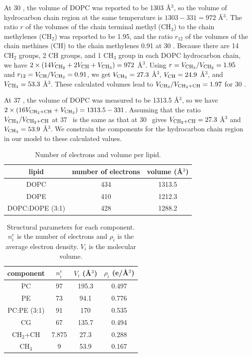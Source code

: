At 30 \textcelsius, the volume of DOPC was reported to be 1303 \AA$^3$, 
so the volume of hydrocarbon chain region at the same temperature is 
$1303 - 331 = 972$ \AA$^3$. The ratio $r$ of the volumes
of the chain terminal methyl (CH$_3$) to the chain methylenes (CH$_2$) was 
reported to be 1.95, and the ratio $r_{12}$ of the volumes of the chain
methines (CH) to the chain methylenes 0.91 at 30 \textcelsius. 
Because there are 14 CH$_2$ groups,
2 CH groups, and 1 CH$_3$ group in each DOPC hydrocarbon chain, we have
$2\times(14V_{\textrm{CH}_2}+2V_\textrm{CH}+V_{\textrm{CH}_3})=972$ \AA$^3$. 
Using $r=V_{\textrm{CH}_3}/V_{\textrm{CH}_2}=1.95$ 
and $r_{12}=V_\textrm{CH}/V_{\textrm{CH}_2}=0.91$, we get $V_{\textrm{CH}_2}=27.3$ \AA$^3$, 
$V_\textrm{CH}=24.9$ \AA$^3$, and $V_{\textrm{CH}_3}=53.3$ \AA$^3$. 
These calculated volumes lead to $V_{\textrm{CH}_3}/V_{\textrm{CH}_2+\textrm{CH}}=1.97$  for 30 \textcelsius. 

At 37 \textcelsius, the volume of DOPC was measured to be 1313.5 \AA$^3$, so
we have $2\times(16V_{\textrm{CH}_2+\textrm{CH}}+V_{\textrm{CH}_3})=1313.5-331$. Assuming that the ratio 
$V_{\textrm{CH}_3}/V_{\textrm{CH}_2+\textrm{CH}}$ at 37 \textcelsius\ is the same as that at 30 \textcelsius\ 
gives $V_{\textrm{CH}_2+\textrm{CH}}=27.3$ \AA$^3$ and $V_{\textrm{CH}_3}=53.9$ \AA$^3$. We constrain
the components for the hydrocarbon chain region in our model 
to these calculated values.

\begin{table}[htbp]
  \centering
  \begin{tabular}{ccc}
    \hline
    lipid & number of electrons & volume (\AA$^3$) \\
    \hline
    DOPC & 434 & 1313.5 \\
    DOPE & 410 & 1212.3 \\
    DOPC:DOPE (3:1) & 428 & 1288.2 \\
    \hline
  \end{tabular}
  \caption{Number of electrons and volume per lipid.}
  \label{tab:electron_volume}
\end{table}

\begin{table}[htbp]
  \centering
  \begin{tabular}{cccc}
    \hline
    component & $n^e_i$ & $V_i$ (\AA$^3$) & $\rho_i$ (e/\AA$^3$) \\
    \hline 
    PC & 97 & 195.3 & 0.497 \\  
    PE & 73 & 94.1  & 0.776 \\
    PC:PE (3:1) & 91 & 170 & 0.535 \\
    CG & 67 & 135.7 & 0.494 \\  
    CH$_2$+CH & 7.875 & 27.3 & 0.288 \\
    CH$_3$ & 9 & 53.9 & 0.167 \\
    \hline
  \end{tabular}
  \caption{Structural parameters for each component. 
  $n^e_i$ is the number of electrons and
  $\rho_i$ is the average electron density.
  $V_i$ is the molecular volume.
  }
  \label{tab:component}
\end{table}

